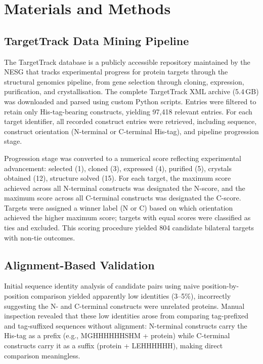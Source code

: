 \documentclass[unnumsec,webpdf,contemporary,large]{oup-authoring-template}
\begin{document}
\section{Materials and Methods}

\subsection{TargetTrack Data Mining Pipeline}
The TargetTrack database \citep{xiao2010} is a publicly accessible repository maintained by the NESG that tracks experimental progress for protein targets through the structural genomics pipeline, from gene selection through cloning, expression, purification, and crystallisation. The complete TargetTrack XML archive (5.4\,GB) was downloaded and parsed using custom Python scripts. Entries were filtered to retain only His-tag-bearing constructs, yielding 97,418 relevant entries. For each target identifier, all recorded construct entries were retrieved, including sequence, construct orientation (N-terminal or C-terminal His-tag), and pipeline progression stage.

Progression stage was converted to a numerical score reflecting experimental advancement: selected (1), cloned (3), expressed (4), purified (5), crystals obtained (12), structure solved (15). For each target, the maximum score achieved across all N-terminal constructs was designated the N-score, and the maximum score across all C-terminal constructs was designated the C-score. Targets were assigned a winner label (N or C) based on which orientation achieved the higher maximum score; targets with equal scores were classified as ties and excluded. This scoring procedure yielded 804 candidate bilateral targets with non-tie outcomes.

\subsection{Alignment-Based Validation}
Initial sequence identity analysis of candidate pairs using naive position-by-position comparison yielded apparently low identities (3--5\%), incorrectly suggesting the N- and C-terminal constructs were unrelated proteins. Manual inspection revealed that these low identities arose from comparing tag-prefixed and tag-suffixed sequences without alignment: N-terminal constructs carry the His-tag as a prefix (e.g., MGHHHHHHSHM + protein) while C-terminal constructs carry it as a suffix (protein + LEHHHHHH), making direct comparison meaningless.
\end{document}
